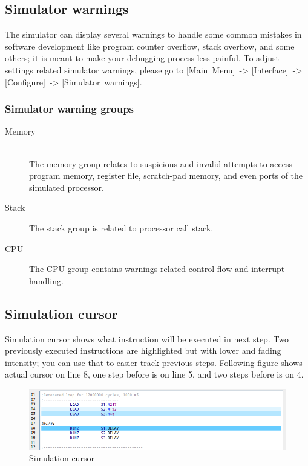     \subsection{Simulator warnings}
        The simulator can display several warnings to handle some common mistakes in software development like program counter overflow, stack overflow, and some others; it is meant to make your debugging process less painful. To adjust settings related simulator warnings, please go to [Main~Menu]~-> [Interface]~-> [Configure]~-> [Simulator~warnings].

        \subsubsection{Simulator warning groups}
        \begin{description}
            \item[Memory]~\\
                The memory group relates to suspicious and invalid attempts to access program memory, register file, scratch-pad memory, and even ports of the simulated processor.
            \item[Stack]
                The stack group is related to processor call stack.
            \item[CPU]
                The CPU group contains warnings related control flow and interrupt handling.
        \end{description}

    \clearpage
    \subsection{Simulation cursor}
        Simulation cursor shows what instruction will be executed in next step. Two previously executed instructions are highlighted but with lower and fading intensity; you can use that to easier track previous steps. Following figure shows actual cursor on line 8, one step before is on line 5, and two steps before is on 4.
        \begin{figure}[h!]
            \centering
            \includegraphics[width=\textwidth]{img/simulationcursor1.png}
            \caption{Simulation cursor}
        \end{figure}

